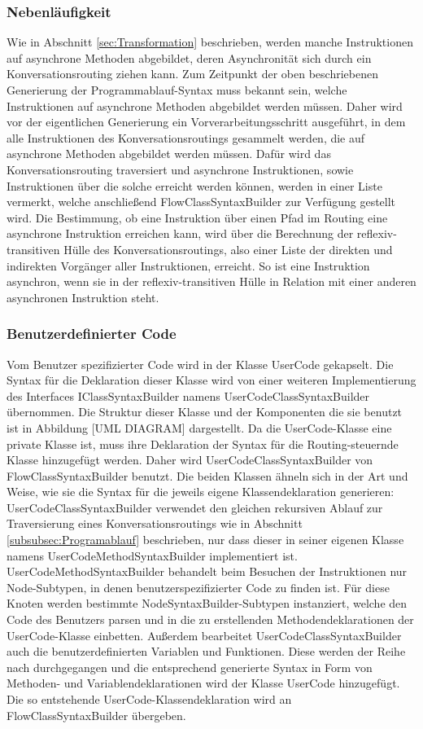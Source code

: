 \subsubsection{Nebenläufigkeit}
\label{subsubsec:Nebenlaeufigkeit}
Wie in Abschnitt \ref{sec:Transformation} beschrieben, werden manche Instruktionen auf asynchrone Methoden abgebildet, deren Asynchronität sich durch ein Konversationsrouting ziehen kann. Zum Zeitpunkt der oben beschriebenen Generierung der Programmablauf-Syntax muss bekannt sein, welche Instruktionen auf asynchrone Methoden abgebildet werden müssen. Daher wird vor der eigentlichen Generierung ein Vorverarbeitungsschritt ausgeführt, in dem alle Instruktionen des Konversationsroutings gesammelt werden, die auf asynchrone Methoden abgebildet werden müssen. Dafür wird das Konversationsrouting traversiert und asynchrone Instruktionen, sowie Instruktionen über die solche erreicht werden können, werden in einer Liste vermerkt, welche anschließend FlowClassSyntaxBuilder zur Verfügung gestellt wird. Die Bestimmung, ob eine Instruktion über einen Pfad im Routing eine asynchrone Instruktion erreichen kann, wird über die Berechnung der reflexiv-transitiven Hülle des Konversationsroutings, also einer Liste der direkten und indirekten Vorgänger aller Instruktionen, erreicht. So ist eine Instruktion asynchron, wenn sie in der reflexiv-transitiven Hülle in Relation mit einer anderen asynchronen Instruktion steht.

\subsubsection{Benutzerdefinierter Code}
Vom Benutzer spezifizierter Code wird in der Klasse UserCode gekapselt. Die Syntax für die Deklaration dieser Klasse wird von einer weiteren Implementierung des Interfaces IClassSyntaxBuilder namens UserCodeClassSyntaxBuilder übernommen. Die Struktur dieser Klasse und der Komponenten die sie benutzt ist in Abbildung [UML DIAGRAM] dargestellt. Da die UserCode-Klasse eine private Klasse ist, muss ihre Deklaration der Syntax für die Routing-steuernde Klasse hinzugefügt werden. Daher wird UserCodeClassSyntaxBuilder von FlowClassSyntaxBuilder benutzt. Die beiden Klassen ähneln sich in der Art und Weise, wie sie die Syntax für die jeweils eigene Klassendeklaration generieren: UserCodeClassSyntaxBuilder verwendet den gleichen rekursiven Ablauf zur Traversierung eines Konversationsroutings wie in Abschnitt \ref{subsubsec:Programablauf} beschrieben, nur dass dieser in seiner eigenen Klasse namens UserCodeMethodSyntaxBuilder implementiert ist. UserCodeMethodSyntaxBuilder behandelt beim Besuchen der Instruktionen nur Node-Subtypen, in denen benutzerspezifizierter Code zu finden ist. Für diese Knoten werden bestimmte NodeSyntaxBuilder-Subtypen instanziert, welche den Code des Benutzers parsen und in die zu erstellenden Methodendeklarationen der UserCode-Klasse einbetten. Außerdem bearbeitet UserCodeClassSyntaxBuilder auch die benutzerdefinierten Variablen und Funktionen. Diese werden der Reihe nach durchgegangen und die entsprechend generierte Syntax in Form von Methoden- und Variablendeklarationen wird der Klasse UserCode hinzugefügt. Die so entstehende UserCode-Klassendeklaration wird an FlowClassSyntaxBuilder übergeben. 

